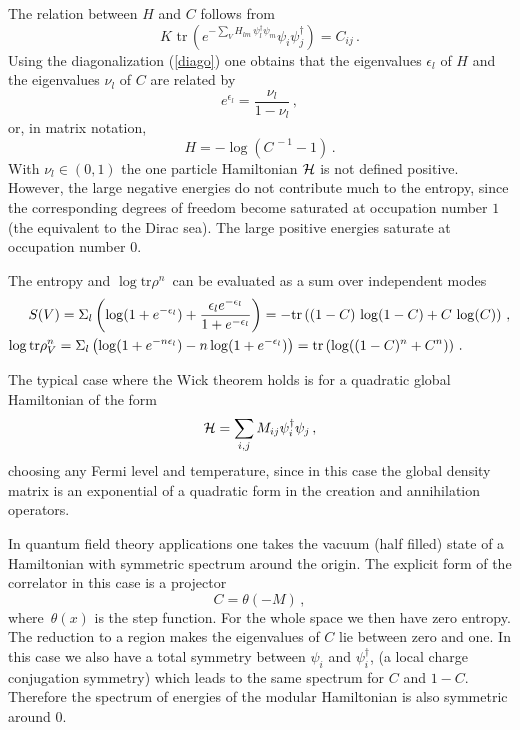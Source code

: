 \documentclass[11pt]{article}
\begin{document}
The relation between $H$ and $C$ follows from
\begin{equation}
K\,\, \textrm{tr}\, \left(e^{-\sum_V H_{lm}\, \psi_{l}^\dagger \psi_{m}} \psi_i \psi_j^\dagger \right)= C_{ij}\,.
\end{equation}
Using the diagonalization (\ref{diago}) one obtains that the eigenvalues 
$\epsilon _{l}$ of $H$ and the eigenvalues $\nu _{l}$ of $C$ are related by 
\begin{equation}
e^{\epsilon _{l}}=\frac{\nu _{l}}{1-\nu _{l}}\,,
\end{equation}
or, in matrix notation,
\begin{equation}
H=-\log \left( C^{\,-1}-1\right)\,.\label{cincuenta}
\end{equation}
With $\nu_l \in (0,1)$ the one particle Hamiltonian ${\cal H}$ is  not defined positive. However,  the large negative energies do not contribute much to the entropy, since the corresponding degrees of freedom become saturated at occupation number $1$ (the equivalent to the Dirac sea). The large positive energies saturate at occupation number $0$. 

The entropy and $\log \textrm{tr}\rho ^{n}\,$ can be evaluated as a sum over independent modes
\begin{eqnarray}
 S(V)=\Sigma_l \left( \log (1+e^{-\epsilon _{l}})+\frac{\epsilon _{l} e^{-\epsilon _{l}}
}{1+e^{-\epsilon _{l}}}\right) =-\textrm{tr}\left((1-C)\,\log (1-C)+C \,\log (C) \right)\,, \label{tiuno}\\
\log \textrm{tr}\rho_V^{n} =\Sigma_l\left(\log (1+e^{-n\epsilon _{l}})-n\log (1+e^{-\epsilon
_{l}})\right) =\textrm{tr} \left( \log ((1-C)^{n}+C^{n})\right)\,.\hspace{1.2cm}\label{44}
\end{eqnarray}

The typical case where the Wick theorem holds is for a quadratic global Hamiltonian of the form 
\begin{equation}
{\cal H}=\sum_{i,j}M_{ij}\psi_{i}^{\dagger }\psi_{j}\,,  \label{hami}
\end{equation}
choosing any Fermi level and temperature, since in this case the  global density matrix is an exponential of a quadratic form in the creation and annihilation operators.

In quantum field theory applications one takes the vacuum (half filled) state of a Hamiltonian with symmetric spectrum around the origin.
 The explicit form of the correlator in this case is a projector
\begin{equation}
C=\theta (-M)\,,
\end{equation}
where $\,\theta (x)$ is the step function. For the whole space we then have zero entropy. The reduction to a region makes the eigenvalues of $C$ lie  between zero and one. In this case we also have a total symmetry between $\psi_i$ and $\psi^\dagger_i$, (a local charge conjugation symmetry) which leads to the same spectrum for $C$ and $1-C$. Therefore the spectrum of energies of the modular Hamiltonian is also symmetric around $0$.
\end{document}

